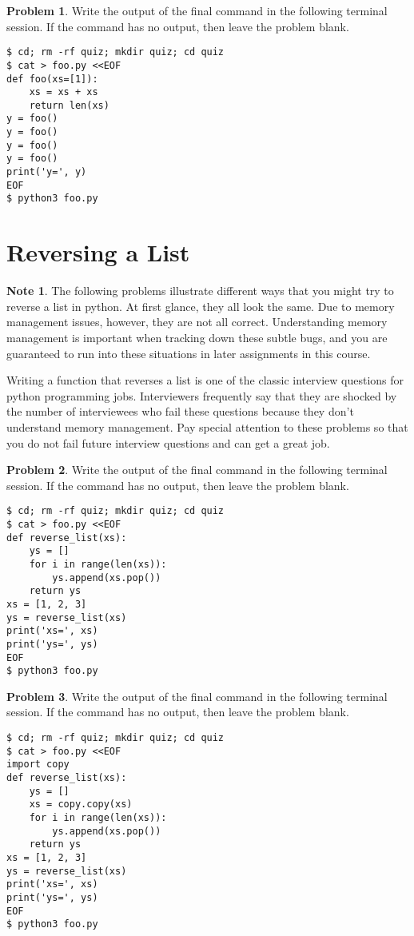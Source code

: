 \documentclass[10pt]{article}
\theoremstyle{definition}
\newtheorem{problem}{Problem}
\newtheorem{note}{Note}
\begin{document}
\filbreak
\begin{problem}
    Write the output of the final command in the following terminal session.
    If the command has no output, then leave the problem blank.
\end{problem}
\begin{lstlisting}
$ cd; rm -rf quiz; mkdir quiz; cd quiz
$ cat > foo.py <<EOF
def foo(xs=[1]):
    xs = xs + xs
    return len(xs)
y = foo()
y = foo()
y = foo()
y = foo()
print('y=', y)
EOF
$ python3 foo.py
\end{lstlisting}


\section{Reversing a List}

\begin{note}
The following problems illustrate different ways that you might try to reverse a list in python.
At first glance, they all look the same.
Due to memory management issues, however, they are not all correct.
Understanding memory management is important when tracking down these subtle bugs,
and you are guaranteed to run into these situations in later assignments in this course.

Writing a function that reverses a list is one of the classic interview questions for python programming jobs.
Interviewers frequently say that they are shocked by the number of interviewees who fail these questions because they don't understand memory management.
Pay special attention to these problems so that you do not fail future interview questions and can get a great job.
\end{note}

\filbreak
\begin{problem}
    Write the output of the final command in the following terminal session.
    If the command has no output, then leave the problem blank.
\end{problem}
\begin{lstlisting}
$ cd; rm -rf quiz; mkdir quiz; cd quiz
$ cat > foo.py <<EOF
def reverse_list(xs):
    ys = []
    for i in range(len(xs)):
        ys.append(xs.pop())
    return ys
xs = [1, 2, 3]
ys = reverse_list(xs)
print('xs=', xs)
print('ys=', ys)
EOF
$ python3 foo.py
\end{lstlisting}


\filbreak
\begin{problem}
    Write the output of the final command in the following terminal session.
    If the command has no output, then leave the problem blank.
\end{problem}
\begin{lstlisting}
$ cd; rm -rf quiz; mkdir quiz; cd quiz
$ cat > foo.py <<EOF
import copy
def reverse_list(xs):
    ys = []
    xs = copy.copy(xs)
    for i in range(len(xs)):
        ys.append(xs.pop())
    return ys
xs = [1, 2, 3]
ys = reverse_list(xs)
print('xs=', xs)
print('ys=', ys)
EOF
$ python3 foo.py
\end{lstlisting}
\end{document}
